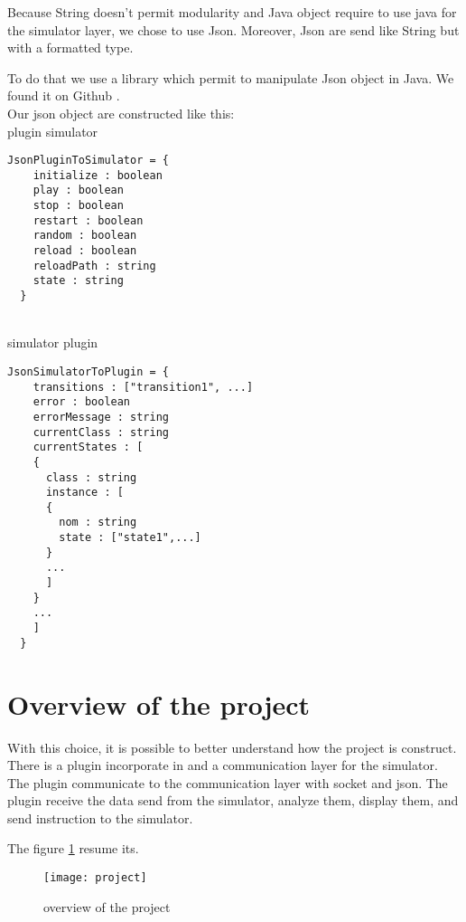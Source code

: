 Because String doesn't permit modularity and Java object require to use java for the simulator layer, we chose to use Json. Moreover, Json are send like String but with a formatted type.

To do that we use a library which permit to manipulate Json object in Java. We found it on Github \cite{json}.
~\\

Our json object are constructed like this:
~\\

plugin \overrightarrow{} simulator
\begin{lstlisting}[style=json]
  JsonPluginToSimulator = {
    initialize : boolean
    play : boolean
    stop : boolean
    restart : boolean
    random : boolean
    reload : boolean
    reloadPath : string
    state : string
  }
\end{lstlisting}

~\\

simulator \overrightarrow{} plugin
\begin{lstlisting}[style=json]
  JsonSimulatorToPlugin = {
    transitions : ["transition1", ...]
    error : boolean
    errorMessage : string
    currentClass : string
    currentStates : [
    {
      class : string
      instance : [
      {
        nom : string
        state : ["state1",...]
      }
      ...
      ]
    }
    ...
    ]
  }

\end{lstlisting}


\section{Overview of the project}

With this choice, it is possible to better understand how the project is construct. There is a plugin incorporate in \umld and a communication layer for the simulator. The plugin communicate to the communication layer with socket and json. The plugin receive the data send from the simulator, analyze them, display them, and send instruction to the simulator.

The figure \ref{fig:project} resume its.

\begin{figure}[h]
  \centering
  \texttt{[image: project]}
  \caption{overview of the project}
  \label{fig:project}
\end{figure}



